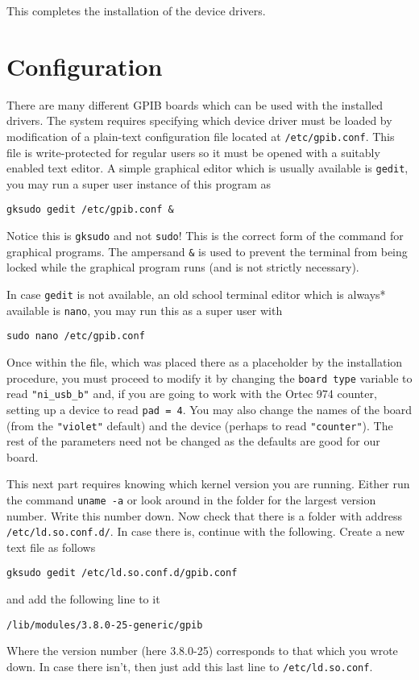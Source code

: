 \documentclass[letterpaper,11pt]{article}
\begin{document}
This completes the installation of the device drivers.

\section{Configuration}
There are many different GPIB boards which can be used with the installed drivers. The system requires specifying which device driver must be loaded by modification of a plain-text configuration file located at \texttt{/etc/gpib.conf}. This file is write-protected for regular users so it must be opened with a suitably enabled text editor. A simple graphical editor which is usually available is  \texttt{gedit}, you may run a super user instance of this program as
\begin{verbatim}
gksudo gedit /etc/gpib.conf &
 \end{verbatim}
Notice this is  \texttt{gksudo} and not \texttt{sudo}! This is the correct form of the command for graphical programs. The ampersand \texttt{\&} is used to prevent the terminal from being locked while the graphical program runs (and is not strictly necessary).

In case  \texttt{gedit} is not available, an old school terminal editor which is always* available is \texttt{nano}, you may run this as a super user with
\begin{verbatim}
sudo nano /etc/gpib.conf
\end{verbatim}
Once within the file, which was placed there as a placeholder by the installation procedure, you must proceed to modify it by changing the \texttt{board type} variable to read \texttt{"ni\_usb\_b"} and, if you are going to work with the Ortec 974 counter, setting up a device to read \texttt{pad = 4}. You may also change the names of the board (from the \texttt{"violet"} default) and the device (perhaps to read \texttt{"counter"}). The rest of the parameters need not be changed as the defaults are good for our board.

This next part requires knowing which kernel version you are running. Either run the command \texttt{uname -a} or look around in the folder  for the largest version number. Write this number down. Now check that there is a folder with address \texttt{/etc/ld.so.conf.d/}. In case there is, continue with the following. Create a new text file as follows
\begin{verbatim}
gksudo gedit /etc/ld.so.conf.d/gpib.conf
\end{verbatim}
and add the following line to it
\begin{verbatim}
/lib/modules/3.8.0-25-generic/gpib
\end{verbatim}
Where the version number (here 3.8.0-25) corresponds to that which you wrote down. In case there isn't, then just add this last line to \texttt{/etc/ld.so.conf}.
\end{document}
